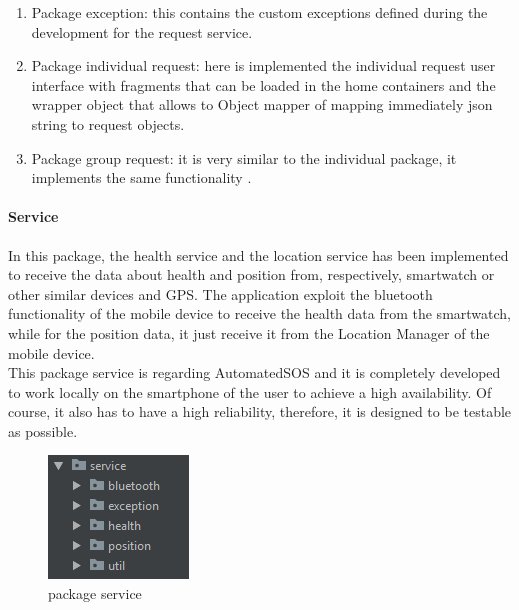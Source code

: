 \begin{enumerate}
\item Package exception: this contains the custom exceptions defined during the development for the request service.
\item Package individual request: here is implemented the individual request user interface with fragments that can be loaded in the home containers and the wrapper object that allows to Object mapper of mapping immediately json string to request objects. 
\item Package group request: it is very similar to the individual package, it implements the same functionality . 
\end{enumerate}
	
\paragraph{Service}
In this package, the health service and the location service has been implemented to receive the data about health and position 
from, respectively, smartwatch or other similar devices and GPS. The application exploit the bluetooth functionality of the mobile device to receive the health data from the smartwatch, while for the position data, it just receive it from the Location Manager of the mobile device.\\

This package service is regarding AutomatedSOS and it is completely developed to work locally on the smartphone of the user to achieve a high availability. Of course, it also has to have a high reliability, therefore, it is designed to be testable as possible. 

\begin{figure}[H]
\includegraphics[width=\linewidth]{images/Service.png}
\caption{ package service }
\label{fig:pkgsharedata}
\end{figure}

